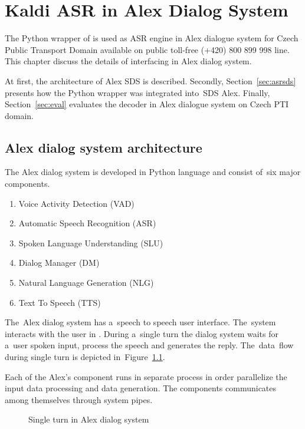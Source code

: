 \chapter{Kaldi \acs{ASR} in Alex Dialog System}
\label{cha:integration}

The Python wrapper of  is used as \ac{ASR} engine in Alex dialogue system for Czech Public Transport Domain available on public toll-free (+420) 800 899 998 line.
This chapter discuss the details of interfacing  in Alex dialog system.

At first, the architecture of Alex \ac{SDS} is described.
Secondly, Section~\ref{sec:asrsds} presents how the Python wrapper  was integrated into~\ac{SDS} Alex.
Finally, Section~\ref{sec:eval} evaluates the decoder in Alex dialogue system on Czech \ac{PTI} domain. 

\section{Alex dialog system architecture} 
\label{sec:arch}
The Alex dialog system is developed in Python language and consist of~six major components. 
\begin{enumerate}
    \item Voice Activity Detection (VAD)
    \item Automatic Speech Recognition (ASR) 
    \item Spoken Language Understanding (SLU)
    \item Dialog Manager (DM)
    \item Natural Language Generation (NLG)
    \item Text To Speech (TTS)
\end{enumerate}
The~Alex dialog system has a~speech to speech user interface. 
The~system interacts with the user in . 
During a~single turn the dialog system waits for a~user spoken input, process the speech and generates the reply.
The~data~flow during single turn is depicted in~Figure~\ref{fig:dialog_system}.

Each of the Alex's component runs in separate process in order parallelize the input data processing and data generation.
The components communicates among themselves through system pipes.

\begin{figure}
    \begin{center}
    
    \caption{Single turn in Alex dialog system}
    \label{fig:dialog_system} 
    \end{center}
\end{figure}

